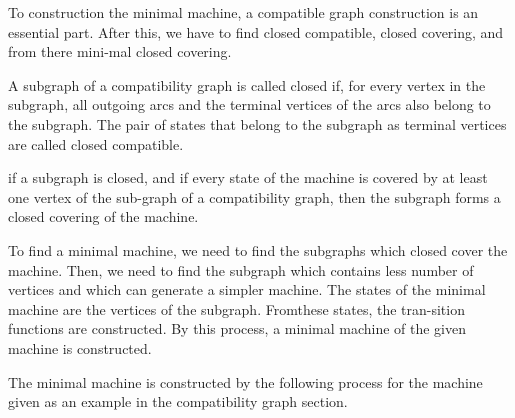 \documentclass[a4]{article}
\begin{document}
\vspace*{1cm}

\vspace*{0.2cm}


To construction the minimal machine, a compatible graph construction is an essential part. After this, we have to find closed compatible, closed covering, and from there mini-mal closed covering.



A subgraph of a compatibility graph is called closed if, for every vertex in the subgraph, all outgoing arcs and the terminal vertices of the arcs also belong to the subgraph. The pair of states that belong to the subgraph as terminal vertices are called closed compatible.




if a subgraph is closed, and if every state of the machine is covered by at least one vertex of the sub-graph of a compatibility graph, then the subgraph forms a closed covering of the machine.



To find a minimal machine, we need to find the subgraphs which closed cover the machine. Then, we need to find the subgraph which contains less number of vertices and which can generate a simpler machine. The states of the minimal machine are the vertices of the subgraph. Fromthese states, the tran-sition functions are constructed. By this process, a minimal machine of the given machine is constructed.



The minimal machine is constructed by the following process for the machine given as an example in the compatibility graph section.
\vspace*{0.5cm}

\begin{center}
\end{center}
\end{document}

